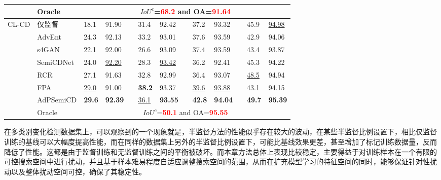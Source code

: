\documentclass[lang=chs, degree=master, blindreview=false, adobe=false]{yanputhesis}
\begin{document}
\begin{table}[H]
{\begin{tabular}{p{20mm}p{25mm}p{8mm}p{8mm}cp{8mm}p{8mm}cp{8mm}p{8mm}cp{8mm}p{8mm}}
      \cline{2-13}
      & Oracle & \multicolumn{11}{c}{$ IoU^c$=\textcolor{red}{\bf 68.2} and OA=\textcolor{red}{\bf 91.64}} \\
      \bottomrule
      \multirow{8}{*}{CL-CD}
      & 仅监督   &   18.1 & 91.90 && 31.4 & 92.42 && 37.2 & 93.32 && 45.9 & \underline{94.98} \\ %
      & AdvEnt\cite{vu2019advent}& 24.3 & 92.13 && 33.2 & 93.01 && 37.6 & 93.59 && 42.9 & 94.06 \\ %
      & s4GAN\cite{mittal2019semi}& 22.1 & 92.00 && 26.6 & 93.09 && 37.4 & 93.59 && 43.4 & 93.87 \\
      & SemiCDNet\cite{peng2021SemiCDNet} & 24.0 & \underline{92.20} && 28.3 & \underline{93.42} && 36.2 & 92.41 && 45.3 & 94.22 \\ %
      & RCR\cite{bandara2022RCR}& 27.1 & 91.63 && 32.8 & 92.99 && 36.4 & 93.07 && \underline{48.5} & 94.94 \\
      & FPA\cite{Zhang2023FPA}& \underline{29.0} & 91.00 && \cellcolor{mycyan}\textbf{38.2} & 93.37 && \underline{39.6} & \underline{93.88} && 43.1 & 94.15 \\
      \rowcolor{mycyan}
      \multirow{-8}{*}{\cellcolor{white}}& \cellcolor{white}AdPSemiCD   &   \textbf{29.6} & \textbf{92.39} && \cellcolor{white}\underline{36.1} & \textbf{93.55} && \textbf{42.8} & \textbf{94.04} && \textbf{49.7} & \textbf{95.39} \\%
      \cline{2-13}
      & Oracle & \multicolumn{11}{c}{$ IoU^c$=\textcolor{red}{\bf 50.1} and OA=\textcolor{red}{\bf 95.55}} \\
      \bottomrule
  \end{tabular}
  }
  \label{tab:AdP-mutil}
\end{table}

在多类别变化检测数据集上，可以观察到的一个现象就是，半监督方法的性能似乎存在较大的波动，在某些半监督比例设置下，相比仅监督训练的基线可以大幅度提高性能，而在同样的数据集上另外的半监督比例设置下，可能比基线效果更差，甚至增加了标记训练数据量，反而降低了性能。这都是由于监督训练和无监督训练之间的平衡被破坏。而本章方法总体上表现比较稳定，主要得益于对训练样本在一个有限的可控搜索空间中进行扰动，并且基于样本难易程度自适应调整搜索空间的范围，从而在扩充模型学习的特征空间的同时，能够保证针对性扰动以及整体扰动空间可控，确保了其稳定性。
\end{document}
